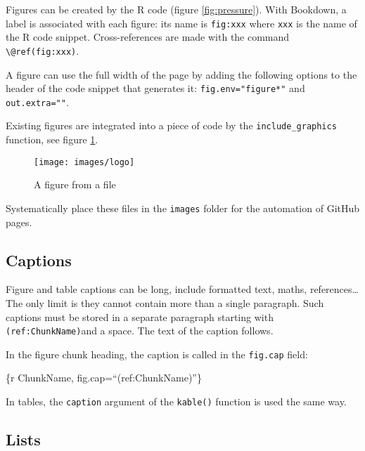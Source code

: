\documentclass[fleqn,]{article} %
\begin{document}
\normalsize

Figures can be created by the R code (figure \ref{fig:pressure}).
With Bookdown, a label is associated with each figure: its name is \texttt{fig:xxx} where \texttt{xxx} is the name of the R code snippet.
Cross-references are made with the command \texttt{\textbackslash{}@ref(fig:xxx)}.

A figure can use the full width of the page by adding the following options to the header of the code snippet that generates it: \texttt{fig.env="figure*"} and \texttt{out.extra=""}.

Existing figures are integrated into a piece of code by the \texttt{include\_graphics} function, see figure \ref{fig:logo}.

\scriptsize

\begin{figure}

{\centering \texttt{[image: images/logo]} 

}

\caption{A figure from a file}\label{fig:logo}
\end{figure}

\normalsize

Systematically place these files in the \texttt{images} folder for the automation of GitHub pages.

\hypertarget{captions}{%
\subsection{Captions}\label{captions}}

Figure and table captions can be long, include formatted text, maths, references\ldots{}
The only limit is they cannot contain more than a single paragraph.
Such captions must be stored in a separate paragraph starting with \texttt{(ref:ChunkName)}and a space.
The text of the caption follows.

In the figure chunk heading, the caption is called in the \texttt{fig.cap} field:

\{r ChunkName, fig.cap=``(ref:ChunkName)''\}

In tables, the \texttt{caption} argument of the \texttt{kable()} function is used the same way.

\hypertarget{lists}{%
\subsection{Lists}\label{lists}}
\end{document}
